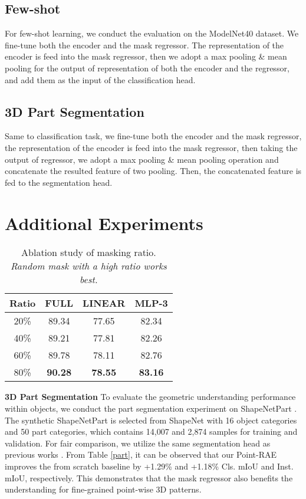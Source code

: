 \documentclass[sigconf, screen]{acmart}
\begin{document}
\subsection{Few-shot}
For few-shot learning, we conduct the evaluation on the ModelNet40 \cite{wu20153d} dataset.
We fine-tune both the encoder and the mask regressor.
The representation of the encoder is feed into the mask regressor, then we adopt a max pooling \& mean pooling for the output of representation of both  the encoder and the regressor, and add them as the input of the classification head.


\subsection{3D Part Segmentation}
Same to classification task, we fine-tune both the encoder and the mask regressor,  the representation of the encoder is feed into the mask regressor, then taking the output of regressor, we adopt a max pooling \& mean pooling operation and concatenate the resulted feature of two pooling.
Then, the concatenated feature is fed to the segmentation head.




\section{Additional Experiments}


\begin{table}[]
    \caption{Ablation study of masking ratio. \textit{Random mask with a high ratio works best.}}
    \centering
        \begin{tabular}{cccc}
        \toprule
        Ratio & FULL & LINEAR & MLP-3\\
        \midrule
         20\% &89.34 & 77.65 & 82.34\\
         40\% &89.21 & 77.81&82.26\\
         60\% &89.78 &78.11 & 82.76\\
         80\% &\textbf{90.28} & \textbf{78.55} & \textbf{83.16}\\
         \bottomrule
        \end{tabular}
        \label{maskratio}
\end{table}

\noindent \textbf{3D Part Segmentation}
To evaluate the geometric understanding performance within objects, we conduct the part segmentation experiment on ShapeNetPart \cite{yi2016scalable}. 
The synthetic ShapeNetPart is selected from ShapeNet with 16 object categories and 50 part categories, which contains 14,007 and 2,874 samples for training and validation. 
For fair comparison, we utilize the same segmentation head as previous works \cite{pang2022masked}.
From Table \ref{part}, it can be observed that our Point-RAE improves the from scratch baseline by +1.29\% and +1.18\% Cls. mIoU and Inst. mIoU, respectively. 
This demonstrates that the mask regressor also benefits the understanding for fine-grained point-wise 3D patterns.
\end{document}
